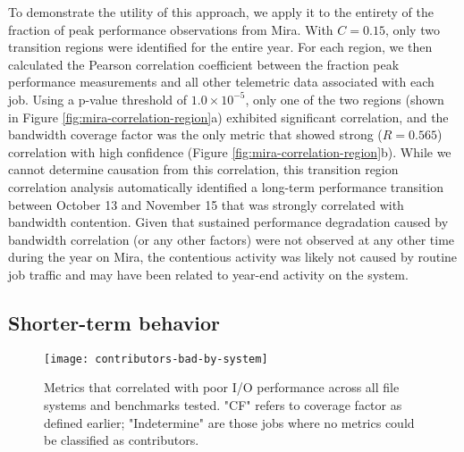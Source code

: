 To demonstrate the utility of this approach, we apply it to the entirety of the fraction of peak performance observations from Mira.
With $C = 0.15$, only two transition regions were identified for the entire year.
For each region, we then calculated the Pearson correlation coefficient between the fraction peak performance measurements and all other telemetric data associated with each job.
Using a p-value threshold of ${1.0 \times 10^{-5}}$, only one of the two regions (shown in Figure \ref{fig:mira-correlation-region}a) exhibited significant correlation, and the bandwidth coverage factor was the only metric that showed strong (${R = 0.565}$) correlation with high confidence (Figure \ref{fig:mira-correlation-region}b).
While we cannot determine causation from this correlation, this transition region correlation analysis automatically identified a long-term performance transition between October 13 and November 15 that was strongly correlated with bandwidth contention.
Given that sustained performance degradation caused by bandwidth correlation (or any other factors) were not observed at any other time during the year on Mira, the contentious activity was likely not caused by routine job traffic and may have been related to year-end activity on the system.







\subsection{Shorter-term behavior} \label{sec:features/shortterm}

\begin{figure}[t]
    \centering
    \texttt{[image: contributors-bad-by-system]}
    \vspace{-.35in}
    \caption{Metrics that correlated with poor I/O performance across all file systems and benchmarks tested.  "CF" refers to coverage factor as defined earlier; "Indetermine" are those jobs where no metrics could be classified as contributors.
    }
    \label{fig:contributors-bad-by-system}
\end{figure}



